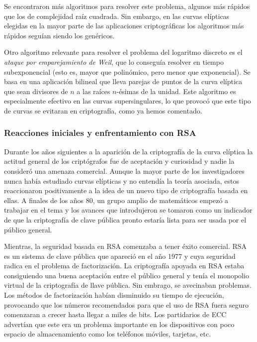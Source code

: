 \documentclass[
  a4paper,
  12pt,
  spanish,
]{scrartcl}
\begin{document}
Se encontraron más algoritmos para resolver este problema, algunos más rápidos que los de complejidad raíz cuadrada. Sin embargo, en las curvas elípticas elegidas en la mayor parte de las aplicaciones criptográficas los algoritmos más rápidos seguían siendo los genéricos.

Otro algoritmo relevante para resolver el problema del logaritmo discreto es el \textit{ataque por emparejamiento de Weil}, que lo conseguía resolver en tiempo subexponencial (esto es, mayor que polinómico, pero menor que exponencial). Se basa en una aplicación bilineal que lleva parejas de puntos de la curva elíptica que sean divisores de $n$ a las raíces $n$-ésimas de la unidad. Este algoritmo es especialmente efectivo en las curvas supersingulares, lo que provocó que este tipo de curvas se evitaran en criptografía, como ya hemos comentado.

\subsubsection{Reacciones iniciales y enfrentamiento con RSA}
Durante los años siguientes a la aparición de la criptografía de la curva elíptica la actitud general de los criptógrafos fue de aceptación y curiosidad y nadie la consideró una amenaza comercial. Aunque la mayor parte de los investigadores nunca había estudiado curvas elípticas y no entendía la teoría asociada, estos reaccionaron positivamente a la idea de un nuevo tipo de criptografía basada en ellas. A finales de los años 80, un grupo amplio de matemáticos empezó a trabajar en el tema y los avances que introdujeron se tomaron como un indicador de que la criptografía de clave pública pronto estaría lista para ser usada por el público general.


Mientras, la seguridad basada en RSA comenzaba a tener éxito comercial. RSA es un sistema de clave pública que apareció en el año 1977 \parencite{rivest_method_1978} y cuya seguridad radica en el problema de factorización. La criptografía apoyada en RSA estaba consiguiendo una buena aceptación entre el público general y tenía el monopolio virtual de la criptografía de llave pública. Sin embrago, se avecinaban problemas. Los métodos de factorización habían disminuido su tiempo de ejecución, provocando que los números recomendados para que el uso de RSA fuera seguro comenzaran a crecer hasta llegar a miles de bits. Los partidarios de ECC advertían que este era un problema importante en los dispositivos con poco espacio de almacenamiento como los teléfonos móviles, tarjetas, etc.
\end{document}
